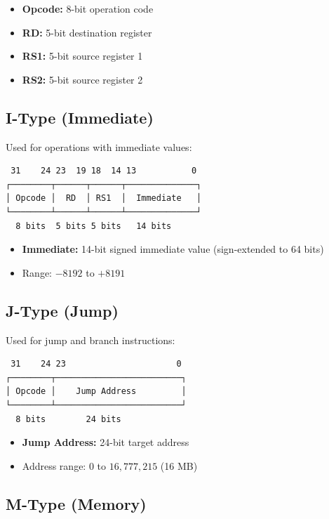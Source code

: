 \documentclass[12pt,a4paper,oneside]{book}
\begin{document}
\begin{itemize}
    \item \textbf{Opcode:} 8-bit operation code
    \item \textbf{RD:} 5-bit destination register
    \item \textbf{RS1:} 5-bit source register 1
    \item \textbf{RS2:} 5-bit source register 2
\end{itemize}

\subsection{I-Type (Immediate)}

Used for operations with immediate values:

\begin{verbatim}
 31    24 23  19 18  14 13           0
┌────────┬──────┬──────┬──────────────┐
│ Opcode │  RD  │ RS1  │  Immediate   │
└────────┴──────┴──────┴──────────────┘
  8 bits  5 bits 5 bits   14 bits
\end{verbatim}

\begin{itemize}
    \item \textbf{Immediate:} 14-bit signed immediate value (sign-extended to 64 bits)
    \item Range: $-8192$ to $+8191$
\end{itemize}

\subsection{J-Type (Jump)}

Used for jump and branch instructions:

\begin{verbatim}
 31    24 23                      0
┌────────┬─────────────────────────┐
│ Opcode │    Jump Address         │
└────────┴─────────────────────────┘
  8 bits        24 bits
\end{verbatim}

\begin{itemize}
    \item \textbf{Jump Address:} 24-bit target address
    \item Address range: $0$ to $16,777,215$ (16 MB)
\end{itemize}

\subsection{M-Type (Memory)}
\end{document}

